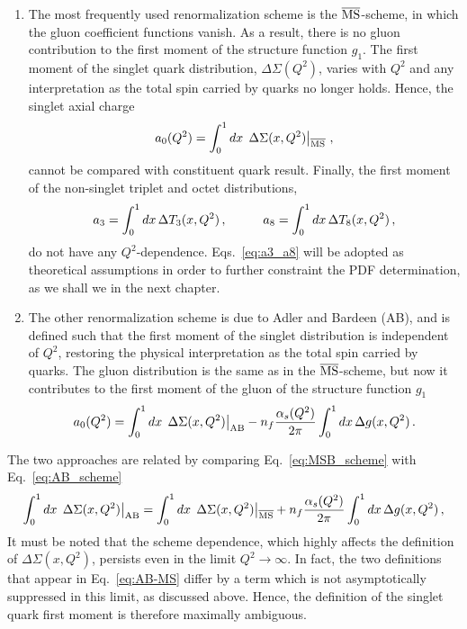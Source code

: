 \begin{enumerate}
  \item The most frequently used renormalization scheme is the $\overline{\textrm{MS}}$-scheme, in which the gluon coefficient functions vanish. As a result, there is no gluon contribution to the first moment of the structure function $g_1$. The first moment of the singlet quark distribution, $\Delta \Sigma (Q^2)$, varies with $Q^2$ and any interpretation as the total spin carried by quarks no longer holds. Hence, the singlet axial charge 
  \begin{equation}
    a_0 (Q^2) = \int_{0}^{1} dx \,  \left.\Delta \Sigma(x,Q^2) \right|_{\overline{\textrm{MS}}} \,,
    \label{eq:MSB_scheme}
  \end{equation}
  cannot be compared with constituent quark result. Finally, the first moment of the non-singlet triplet and octet distributions,
  \begin{equation}
    a_3 = \int_{0}^{1} dx \, \Delta T_3 (x,Q^2) \,, \hspace{10mm} a_8 = \int_{0}^{1} dx \, \Delta T_8 (x,Q^2) \,,
    \label{eq:a3_a8}
  \end{equation}
  do not have any $Q^2$-dependence. Eqs.~\eqref{eq:a3_a8} will be adopted as theoretical assumptions in order to further constraint the PDF determination, as we shall we in the next chapter.
  
  \item The other renormalization scheme is due to Adler and Bardeen (AB), and is defined such that the first moment of the singlet distribution is independent of $Q^2$, restoring the physical interpretation as the total spin carried by quarks. The gluon distribution is the same as in the $\overline{\textrm{MS}}$-scheme, but now it contributes to the first moment of the gluon of the structure function $g_1$
  \begin{equation}
    a_{0}(Q^2) = \int_{0}^{1} dx \, \left. \Delta \Sigma (x,Q^2) \right|_{\textrm{AB}} - n_f \frac{\alpha_s(Q^2)}{2\pi} \int_{0}^{1} dx \, \Delta g(x,Q^2) \,.
    \label{eq:AB_scheme}
  \end{equation}
\end{enumerate}
The two approaches are related by comparing Eq.~\eqref{eq:MSB_scheme} with Eq.~\eqref{eq:AB_scheme}
\begin{equation}
  \int_{0}^{1} dx \, \left. \Delta \Sigma (x,Q^2) \right|_{\textrm{AB}} = \int_{0}^{1} dx \, \left. \Delta \Sigma (x,Q^2) \right|_{\overline{\textrm{MS}}} + n_f \frac{\alpha_s(Q^2)}{2\pi}  \int_0^1 dx \, \Delta g(x,Q^2)\,,
  \label{eq:AB-MS}
\end{equation}
It must be noted that the scheme dependence, which highly affects the definition of $\Delta \Sigma (x,Q^2)$, persists even in the limit $Q^2 \rightarrow \infty$. In fact, the two definitions that appear in Eq.~\eqref{eq:AB-MS} differ by a term which is not asymptotically suppressed in this limit, as discussed above. Hence, the definition of the singlet quark first moment is therefore maximally ambiguous.


